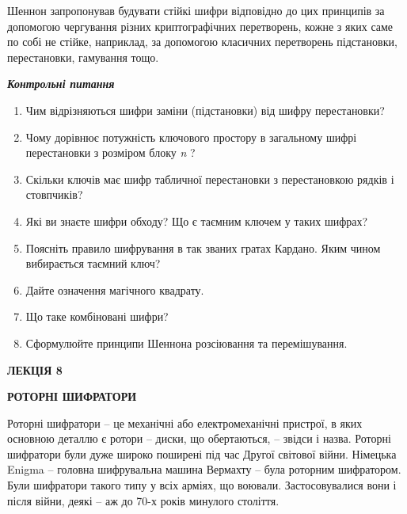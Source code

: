 \documentclass[a4paper]{article}
\newcommand\liststyleWWviiiNumxvii{%
\renewcommand\theenumi{\arabic{enumi}}
\renewcommand\theenumii{\alph{enumii}}
\renewcommand\theenumiii{\roman{enumiii}}
\renewcommand\theenumiv{\arabic{enumiv}}
\renewcommand\labelenumi{\theenumi.}
\renewcommand\labelenumii{\theenumii.}
\renewcommand\labelenumiii{\theenumiii.}
\renewcommand\labelenumiv{\theenumiv.}
}
\newcounter{}
\begin{document}
 Шеннон запропонував будувати стійкі шифри відповідно до цих принципів за
допомогою чергування різних криптографічних перетворень, кожне з яких саме по
собі не стійке, наприклад, за допомогою класичних перетворень підстановки,
перестановки, гамування тощо.


\bigskip


\bigskip

{\centering\bfseries\itshape
Контрольні питання
\par}


\bigskip


\bigskip

\liststyleWWviiiNumxvii
\begin{enumerate}
\item Чим відрізняються шифри заміни (підстановки) від шифру перестановки?
\item Чому дорівнює потужність ключового простору в загальному шифрі
перестановки з розміром блоку \textit{n}\textit{ }?
\item Скільки ключів має шифр табличної перестановки з перестановкою рядків і
стовпчиків? 
\item Які ви знаєте шифри обходу? Що є таємним ключем у таких шифрах?
\item Поясніть правило шифрування в так званих гратах Кардано. Яким чином
вибирається таємний ключ?
\item Дайте означення магічного квадрату.
\item Що таке комбіновані шифри?
\item Сформулюйте принципи Шеннона розсіювання  та перемішування. 
\end{enumerate}

\bigskip


\bigskip


\bigskip


\bigskip


\bigskip

{\bfseries
ЛЕКЦІЯ  8}


\bigskip

{\centering\bfseries
РОТОРНІ  ШИФРАТОРИ
\par}


\bigskip


\bigskip

Роторні шифратори  –  це механічні або електромеханічні пристрої, в яких
основною деталлю є ротори  –  диски, що обертаються, –  звідси і назва. Роторні
шифратори були дуже широко поширені під час Другої світової війни. Німецька
Enigma – головна шифрувальна машина Вермахту – була роторним шифратором. Були
шифратори такого типу у всіх арміях, що воювали. Застосовувалися вони і після
війни, деякі – аж до 70-х років минулого століття.
\end{document}
